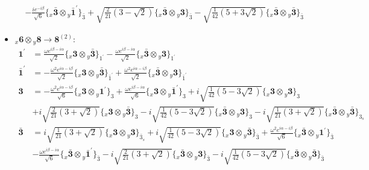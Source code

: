 \documentclass[english]{article}
\newcommand{\rep}[1]{\mathbf{#1}}
\newcommand{\repx}[2]{{}_{#2}\mathbf{#1}}
\newcommand{\tsprodx}[2]{\repx{#1}{x}\otimes\repx{#2}{y}}
\newcommand{\subcgt}[3]{\big\{ \tsprodx{#1}{#2}\big\}^{}_{#3}}
\begin{document}
\begin{itemize}
\begin{align*}
 & -\frac{i e^{-i \beta }}{\sqrt{6}}\subcgt{\bar{3}}{\bar{1}^{\prime}}{\bar{3}}+\sqrt{\frac{2}{21} \left(3-\sqrt{2}\right)}\subcgt{\bar{3}}{3}{\bar{3}}-\sqrt{\frac{1}{42} \left(5+3 \sqrt{2}\right)}\subcgt{\bar{3}}{\bar{3}}{\bar{3}}
\end{align*}
\item $\tsprodx{6}{8}\to\rep{8}^{(2)}$:
\begin{align*}
\rep{1^{\prime}} & = \frac{\omega  e^{i \beta -i \alpha }}{\sqrt{2}}\subcgt{3}{\bar{3}}{1^{\prime}}-\frac{\omega  e^{i \beta -i \alpha }}{\sqrt{2}}\subcgt{\bar{3}}{3}{1^{\prime}}
\\
\rep{\bar{1}^{\prime}} & = -\frac{\omega ^2 e^{i \alpha -i \beta }}{\sqrt{2}}\subcgt{3}{\bar{3}}{\bar{1}^{\prime}}+\frac{\omega ^2 e^{i \alpha -i \beta }}{\sqrt{2}}\subcgt{\bar{3}}{3}{\bar{1}^{\prime}}
\\
\rep{3} & = -\frac{\omega ^2 e^{i \alpha -i \beta }}{\sqrt{6}}\subcgt{3}{1^{\prime}}{3}+\frac{\omega  e^{i \beta -i \alpha }}{\sqrt{6}}\subcgt{3}{\bar{1}^{\prime}}{3}+i \sqrt{\frac{1}{42} \left(5-3 \sqrt{2}\right)}\subcgt{3}{3}{3} \\ 
 & +i \sqrt{\frac{2}{21} \left(3+\sqrt{2}\right)}\subcgt{3}{\bar{3}}{3}-i \sqrt{\frac{1}{42} \left(5-3 \sqrt{2}\right)}\subcgt{\bar{3}}{3}{3}-i \sqrt{\frac{1}{21} \left(3+\sqrt{2}\right)}\subcgt{\bar{3}}{\bar{3}}{3_{s}}
\\
\rep{\bar{3}} & = i \sqrt{\frac{1}{21} \left(3+\sqrt{2}\right)}\subcgt{3}{3}{\bar{3}_{s}}+i \sqrt{\frac{1}{42} \left(5-3 \sqrt{2}\right)}\subcgt{3}{\bar{3}}{\bar{3}}+\frac{\omega ^2 e^{i \alpha -i \beta }}{\sqrt{6}}\subcgt{\bar{3}}{1^{\prime}}{\bar{3}} \\ 
 & -\frac{\omega  e^{i \beta -i \alpha }}{\sqrt{6}}\subcgt{\bar{3}}{\bar{1}^{\prime}}{\bar{3}}-i \sqrt{\frac{2}{21} \left(3+\sqrt{2}\right)}\subcgt{\bar{3}}{3}{\bar{3}}-i \sqrt{\frac{1}{42} \left(5-3 \sqrt{2}\right)}\subcgt{\bar{3}}{\bar{3}}{\bar{3}}
\end{align*}
\end{itemize}
\end{document}
